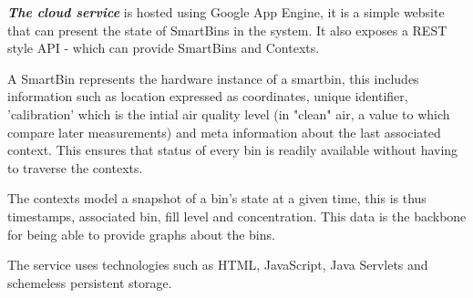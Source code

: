 \textit{\textbf{The cloud service}} is hosted using Google App Engine, it is a simple website that can present the state of SmartBins in the system. It also exposes a REST style API - which can provide SmartBins and Contexts.

A SmartBin represents the hardware instance of a smartbin, this includes information such as location expressed as coordinates, unique identifier, 'calibration' which is the intial air quality level (in "clean" air, a value to which compare later measurements) and meta information about the last associated context.
This ensures that status of every bin is readily available without having to traverse the contexts.

The contexts model a snapshot of a bin's state at a given time, this is thus timestamps, associated bin, fill level and concentration. This data is the backbone for being able to provide graphs about the bins.

The service uses technologies such as HTML, JavaScript, Java Servlets and schemeless persistent storage.

